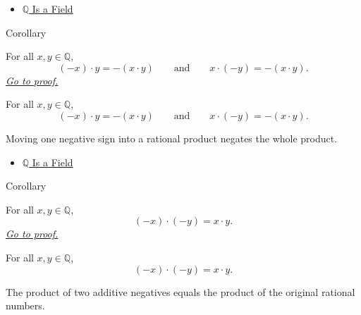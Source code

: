 \begin{dependencies}
\begin{itemize}
  \item \hyperref[thm:q-is-a-field]{$\mathbb{Q}$ Is a Field}
\end{itemize}
\end{dependencies}

\begin{corollarybox}{Corollary}
\begin{corollary}
\label{cor:negation-of-product-on-q}
For all $x,y\in\mathbb{Q}$,
\[
(-x)\cdot y=-(x\cdot y)
\qquad\text{and}\qquad
x\cdot(-y)=-(x\cdot y).
\]
\hyperref[prf:negation-of-product-on-q]{\textit{Go to proof.}}
\end{corollary}
\end{corollarybox}

\begin{remark*}
For all $x,y\in\mathbb{Q}$,
\[
(-x)\cdot y=-(x\cdot y)
\qquad\text{and}\qquad
x\cdot(-y)=-(x\cdot y).
\]
\end{remark*}

\begin{remark*}[Interpretation]
Moving one negative sign into a rational product negates the whole product.
\end{remark*}

\begin{dependencies}
\begin{itemize}
  \item \hyperref[thm:q-is-a-field]{$\mathbb{Q}$ Is a Field}
\end{itemize}
\end{dependencies}

\begin{corollarybox}
{Corollary}
\begin{corollary}
\label{cor:product-of-negatives-on-q}
For all $x,y\in\mathbb{Q}$,
\[
(-x)\cdot(-y)=x\cdot y.
\]
\hyperref[prf:product-of-negatives-on-q]{\textit{Go to proof.}}
\end{corollary}
\end{corollarybox}

\begin{remark*}
For all $x,y\in\mathbb{Q}$,
\[
(-x)\cdot(-y)=x\cdot y.
\]
\end{remark*}

\begin{remark*}[Interpretation]
The product of two additive negatives equals the product of the original
rational numbers.
\end{remark*}

